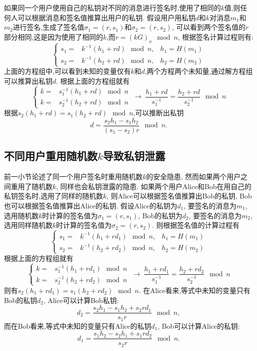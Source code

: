 \documentclass{article}
\begin{document}
如果同一个用户使用自己的私钥对不同的消息进行签名时,使用了相同的$k$值,则任何人可以根据消息和签名值推算出用户的私钥.
假设用户用私钥$d$和$k$对消息$m_1$和$m_2$进行签名,生成了签名值$\sigma_1=(r, s_1)$和$\sigma_2=(r, s_2)$,
可以看到两个签名值的$r$部分相同,这是因为使用了相同的$k$,而$r = (kG)_x \mod n$, 根据签名计算过程则有:
\begin{equation}\nonumber
\left\{
\begin{array}{lll}
s_1 = & k^{-1}(h_1 + rd) \mod n, & h_1 = H(m_1)\\
s_2 = & k^{-1}(h_2 + rd) \mod n, & h_2 = H(m_2)
\end{array}
\right.
\end{equation}
上面的方程组中,可以看到未知的变量仅有$k$和$d$,两个方程两个未知量,通过解方程组可以推算出私钥$d$.
根据上面的方程组就有
\begin{equation}\nonumber
\left\{
\begin{array}{ll}
k = & s_1^{-1} (h_1 + rd) \mod n \\
k = & s_2^{-1} (h_2 + rd) \mod n
\end{array}
\right.
\ 
\rightarrow
\ 
\dfrac{h_1+rd}{s_1^{-1}} = \dfrac{h_2+rd}{s_2^{-1}} \mod n
\end{equation}
根据$s_2(h_1+rd) = s_1(h_2+rd)\mod n$,可以推断出私钥
$$d = \dfrac{s_2h_1 - s_1h_2}{(s_1-s_2)r} \mod n.$$

\subsection{不同用户重用随机数$k$导致私钥泄露}

前一小节论述了同一个用户签名时重用随机数$k$的安全隐患, 然而如果两个用户之间重用了随机数$k$, 同样也会私钥泄露的隐患.
如果两个用户Alice和Bob在用自己的私钥签名时,选用了同样的随机数$k$,
则Alice可以根据签名值推算出Bob的私钥, Bob也可以根据签名值推算出Alice的私钥.
假设Alice的私钥为$d_1$, 要签名的消息为$m_1$, 选用随机数$k$时计算的签名值为$\sigma_1 = (r, s_1)$,
Bob的私钥为$d_2$, 要签名的消息为$m_2$, 选用同样随机数$k$时计算的签名值为$\sigma_2 = (r, s_2)$.
则根据签名值的计算过程有
\begin{equation}\nonumber
\left\{
\begin{array}{lll}
s_1 = & k^{-1}(h_1 + rd_1) \mod n, & h_1 = H(m_1)\\
s_2 = & k^{-1}(h_2 + rd_2) \mod n, & h_2 = H(m_2)
\end{array}
\right.
\end{equation}
根据上面的方程组就有
\begin{equation}\nonumber
\left\{
\begin{array}{ll}
k = & s_1^{-1} (h_1 + rd_1) \mod n \\
k = & s_2^{-1} (h_2 + rd_2) \mod n
\end{array}
\right.
\ 
\rightarrow
\ 
\dfrac{h_1+rd_1}{s_1^{-1}} = \dfrac{h_2+rd_2}{s_2^{-1}} \mod n
\end{equation}
则有$s_2(h_1+rd_1) = s_1(h_2+rd_2) \mod n$.
在Alice看来,等式中未知的变量只有Bob的私钥$d_2$, Alice可以计算Bob私钥:
$$d_2 = \dfrac{s_2h_1 - s_1h_2 + s_2rd_1}{s_1r} \mod n,$$
而在Bob看来,等式中未知的变量只有Alice的私钥$d_1$, Bob可以计算Alice的私钥:
$$d_1 = \dfrac{s_1h_2 - s_2h_1 + s_1rd_2}{s_2r} \mod n.$$
\end{document}

